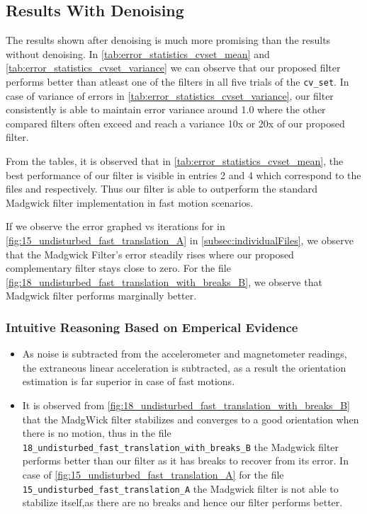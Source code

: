 \documentclass{iutbscthesis}
\begin{document}
\subsection{Results With Denoising}

The results shown after denoising is much more promising than the results without denoising. In 
\autoref{tab:error_statistics_cvset_mean} and \autoref{tab:error_statistics_cvset_variance} we can observe 
that our proposed filter performs better than atleast one of the filters in all five trials of the \texttt{cv\_set}.
In case of variance of errors in \autoref{tab:error_statistics_cvset_variance}, our filter consistently is able to maintain error variance around 1.0 where the other compared 
filters often exceed and reach a variance 10x or 20x of our proposed filter.

From the tables, it is observed that in \autoref{tab:error_statistics_cvset_mean}, the best performance of
our filter is visible in entries 2 and 4 which correspond to the files  and  respectively.
Thus our filter is able to outperform the standard Madgwick filter implementation in fast motion scenarios.

If we observe the error graphed vs iterations for  in \autoref{fig:15_undisturbed_fast_translation_A} in \autoref{subsec:individualFiles}, we observe that the
Madgwick Filter's error steadily rises where our proposed complementary filter stays close to zero. For the file \autoref{fig:18_undisturbed_fast_translation_with_breaks_B},
we observe that Madgwick filter performs marginally better.

\subsubsection{Intuitive Reasoning Based on Emperical Evidence}

\begin{itemize}
    \item As noise is subtracted from the accelerometer and magnetometer readings, the extraneous linear acceleration is subtracted, as a 
    result the orientation estimation is far superior in case of fast motions.
    \item It is observed from \autoref{fig:18_undisturbed_fast_translation_with_breaks_B} that the MadgWick filter stabilizes and converges to a good orientation when there is no motion, thus in the file \\ \texttt{18\_undisturbed\_fast\_translation\_with\_breaks\_B} the Madgwick filter performs better than our filter as it
    has breaks to recover from its error. In case of \autoref{fig:15_undisturbed_fast_translation_A} for the file 
    \texttt{15\_undisturbed\_fast\_translation\_A} the Madgwick filter is not able to stabilize itself,as there are no breaks and hence our filter performs better.
\end{itemize}
\end{document}

